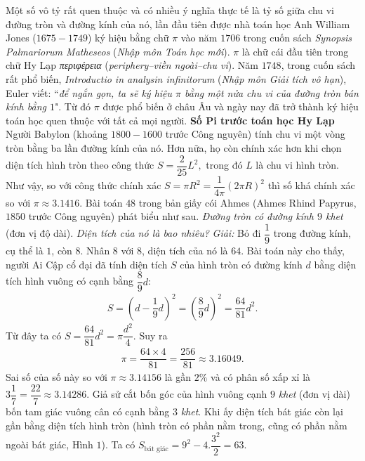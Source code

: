 \begin{multicols}{2}
	Một số vô tỷ rất quen thuộc và có nhiều ý nghĩa thực tế là tỷ số giữa chu vi đường tròn và đường kính của nó, lần đầu tiên được nhà toán học Anh William Jones ($1675-1749$) ký hiệu bằng chữ $\pi$ vào năm $1706$  trong cuốn sách \textit{Synopsis Palmariorum Matheseos} (\textit{Nhập môn Toán học mới}).  $\pi$ là chữ cái đầu tiên trong chữ Hy Lạp \textit{περιφέρεια} (\textit{periphery--viền ngoài--chu vi}). Năm $1748$, trong cuốn sách rất phổ biến, \textit{Introductio in analysin infinitorum} (\textit{Nhập môn Giải tích vô hạn}), Euler viết: ``\textit{để ngắn gọn, ta sẽ ký hiệu $\pi$ bằng một nửa chu vi của đường tròn bán kính bằng $1$}". Từ đó $\pi$ được phổ biến ở châu Âu và ngày nay đã trở thành ký hiệu toán học quen thuộc với tất cả mọi người.
	\vskip 0.1cm
	\textbf{\color{lichsutoanhoc}Số Pi trước toán học Hy Lạp}
	\vskip 0.1cm
	Người Babylon (khoảng $1800-1600$ trước Công nguyên) tính chu vi một vòng tròn bằng ba lần đường kính của nó. Hơn nữa, họ còn chính xác hơn khi chọn diện tích hình tròn theo công thức $S = \dfrac{2}{{25}}{L^2},$  trong đó $L$  là chu vi hình tròn. Như vậy, so với công thức chính xác $S = \pi {R^2} = \dfrac{1}{{4\pi }}{\left( {2\pi R} \right)^2}$  thì số  khá chính xác so với $\pi  \approx 3.1416$.
	\vskip 0.1cm
	Bài toán $48$ trong bản giấy cói Ahmes (Ahmes Rhind Papyrus, $1850$ trước Công nguyên) phát biểu như sau. \textit{Đường tròn có đường kính $9$ khet} (đơn vị độ dài). \textit{Diện tích của nó là bao nhiêu?}
	\vskip 0.1cm
	\textit{Giải:} Bỏ đi $\dfrac{1}{9}$ trong đường kính, cụ thể là $1$, còn $8$. Nhân $8$ với $8$, diện tích của nó là $64$.
	\vskip 0.1cm 
	Bài toán này cho thấy, người Ai Cập cổ đại đã tính diện tích  $S$ của hình tròn có đường kính $d$ bằng diện tích hình vuông có cạnh bằng $\dfrac{8}{9}d$: 
	\setlength{\abovedisplayskip}{5pt}
	\setlength{\belowdisplayskip}{5pt}
	\begin{align*}
		S = {\left( {d - \dfrac{1}{9}d} \right)^2} = {\left( {\dfrac{8}{9}d} \right)^2} = \dfrac{{64}}{{81}}{d^2}.
	\end{align*}
	Từ đây ta có  $S = \dfrac{{64}}{{81}}{d^2} = \pi \dfrac{{{d^2}}}{4}$. Suy ra
	\begin{align*}
		\pi  = \dfrac{{64 \times 4}}{{81}} = \dfrac{{256}}{{81}} \approx 3.16049.
	\end{align*}
	Sai số của số này so với  $\pi  \approx 3.14156$ là gần $2\%$ và có phân số xấp xỉ là $3\dfrac{1}{7} = \dfrac{{22}}{7} \approx 3.14286$.
	\vskip 0.1cm 
	Giả sử cắt bốn góc của hình vuông cạnh $9$ \textit{khet} (đơn vị dài) bốn tam giác vuông cân có cạnh bằng $3$ \textit{khet}. Khi ấy diện tích bát giác còn lại gần bằng diện tích hình tròn (hình tròn có phần nằm trong, cũng có phần nằm ngoài bát giác, Hình $1$). Ta có ${S_{{\text{bát giác}}}} = {9^2} - 4.\dfrac{{{3^2}}}{2} = 63.$   

\end{multicols}
